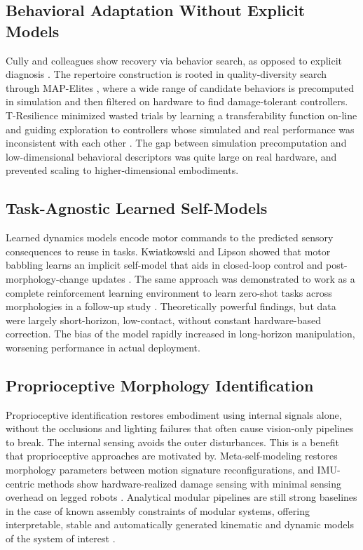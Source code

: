 \documentclass[11pt,a4paper]{article}
\begin{document}
\subsection{Behavioral Adaptation Without Explicit Models}

Cully and colleagues show recovery via behavior search, as opposed to explicit diagnosis \cite{cully2015robots}. The repertoire construction is rooted in quality-diversity search through MAP-Elites \cite{mouret2015illuminating}, where a wide range of candidate behaviors is precomputed in simulation and then filtered on hardware to find damage-tolerant controllers. T-Resilience minimized wasted trials by learning a transferability function on-line and guiding exploration to controllers whose simulated and real performance was inconsistent with each other \cite{koos2013fast}. The gap between simulation precomputation and low-dimensional behavioral descriptors was quite large on real hardware, and prevented scaling to higher-dimensional embodiments.

\subsection{Task-Agnostic Learned Self-Models}

Learned dynamics models encode motor commands to the predicted sensory consequences to reuse in tasks. Kwiatkowski and Lipson showed that motor babbling learns an implicit self-model that aids in closed-loop control and post-morphology-change updates \cite{kwiatkowski2019task}. The same approach was demonstrated to work as a complete reinforcement learning environment to learn zero-shot tasks across morphologies in a follow-up study \cite{kwiatkowski2019zeroshot}. Theoretically powerful findings, but data were largely short-horizon, low-contact, without constant hardware-based correction. The bias of the model rapidly increased in long-horizon manipulation, worsening performance in actual deployment.

\subsection{Proprioceptive Morphology Identification}

Proprioceptive identification restores embodiment using internal signals alone, without the occlusions and lighting failures that often cause vision-only pipelines to break. The internal sensing avoids the outer disturbances. This is a benefit that proprioceptive approaches are motivated by. Meta-self-modeling restores morphology parameters between motion signature reconfigurations\cite{hu2024reconfigurable}, and IMU-centric methods show hardware-realized damage sensing with minimal sensing overhead on legged robots \cite{farghdani2025robust}. Analytical modular pipelines are still strong baselines in the case of known assembly constraints of modular systems, offering interpretable, stable and automatically generated kinematic and dynamic models of the system of interest \cite{dogra2022unified}.
\end{document}
